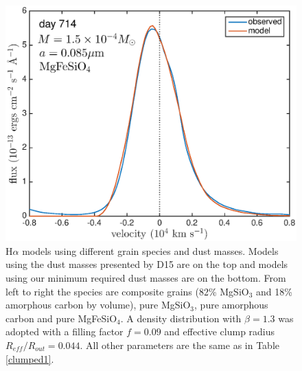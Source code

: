 \documentclass[useAMS,usenatbib,usegraphicx]{mnras}
\begin{document}
\begin{figure}
\includegraphics[trim =24 0 0 -10,clip=true,scale=0.26]{silicates_take2/MgFeSiO4_bestfit_Ha}
\caption{H$\alpha$ models using different grain species and dust masses.  Models using the dust masses presented by D15 are on the top and models using our minimum required dust masses are on the bottom.  From left to right the species are composite grains (82\% MgSiO$_3$ and 18\% amorphous carbon by volume), pure MgSiO$_3$, pure amorphous carbon and pure MgFeSiO$_4$.  A density distribution with $\beta=1.3$ was adopted with a filling factor $f=0.09$ and effective clump radius $R_{eff}/R_{out}=0.044$.  All other parameters are the same as in Table \ref{clumped1}.}
\label{Dwek_models_Ha}
\end{figure}
\end{document}
